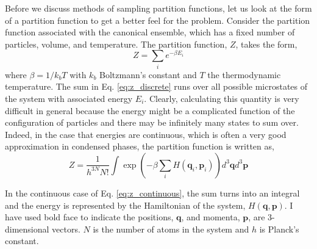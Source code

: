\documentclass[11pt, proquest]{uwthesis}[2020/02/24]
\begin{document}
\par Before we discuss methods of sampling partition functions, let us look at the form of a partition function to get a better feel for the problem. Consider the partition function associated with the canonical ensemble, which has a fixed number of particles, volume, and temperature. The partition function, $Z$, takes the form,
\begin{equation}
    Z=\sum_ie^{-\beta E_i}
    \label{eq:z_discrete}
\end{equation}
where $\beta=1/k_bT$ with $k_b$ Boltzmann's constant and $T$ the thermodynamic temperature. The sum in Eq. \ref{eq:z_discrete} runs over all possible microstates of the system with associated energy $E_i$. Clearly, calculating this quantity is very difficult in general because the energy might be a complicated function of the configuration of particles and there may be infinitely many states to sum over. Indeed, in the case that energies are continuous, which is often a very good approximation in condensed phases, the partition function is written as,
\begin{equation}
    Z=\frac{1}{h^{3N}N!}\int \exp\left(-\beta \sum_i H(\mathbf{q}_i,\mathbf{p}_i)\right)d^3\mathbf{q}d^3\mathbf{p}
    \label{eq:z_continuous}
\end{equation}

In the continuous case of Eq. \ref{eq:z_continuous}, the sum turns into an integral and the energy is represented by the Hamiltonian of the system, $H(\mathbf{q},\mathbf{p})$. I have used bold face to indicate the positions, $\mathbf{q}$, and momenta, $\mathbf{p}$, are 3-dimensional vectors. $N$ is the number of atoms in the system and $h$ is Planck's constant.
\end{document}
